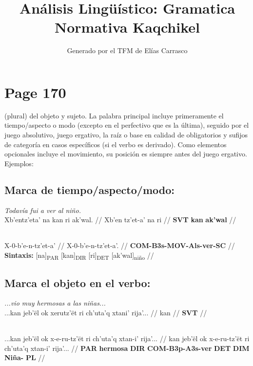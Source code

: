 \documentclass{article}%
\title{Análisis Lingüístico: Gramatica Normativa Kaqchikel}%
\author{Generado por el TFM de Elías Carrasco}%
\begin{document}
%
\normalsize%
\maketitle%
\section{Page 170}%
\label{sec:Page170}%
(plural) del objeto y sujeto. La palabra principal incluye primeramente el tiempo/aspecto %
o modo (excepto en el perfectivo que es la última), seguido por el juego absolutivo, %
juego ergativo, la raíz o base en calidad de obligatorios y sufijos de categoría en casos %
específicos (si el verbo es derivado). Como elementos opcionales incluye el movimiento, %
su posición es siempre antes del juego ergativo. Ejemplos: %
\subsection{Marca de tiempo/aspecto/modo:}%
\label{subsec:Marcadetiempo/aspecto/modo}%

%
\par\medskip%
\ex
\textit{Todavía fui a ver al niño.} \\
\begingl
\gla Xb'entz'eta' na kan ri ak'wal. //
\glb Xb'en tz'et-a' na ri //
\glc \textbf{SVT} \textbf{} \textbf{kan} \textbf{ak'wal} //
\endgl
\xe
%
\medskip%
\par\medskip%
\ex
\textit{} \\
\begingl
\gla X-0-b'e-n-tz'et-a' //
\glb X-0-b'e-n-tz'et-a'. //
\glc \textbf{COM-}\textbf{B3s-}\textbf{MOV-}\textbf{Als-}\textbf{ver-}\textbf{SC} //
\glft \textbf{Sintaxis:} [na]\textsubscript{PAR} [kan]\textsubscript{DIR} [ri]\textsubscript{DET} [ak'wal]\textsubscript{niño} //
\endgl
\xe
%
\medskip%
\subsection{Marca el objeto en el verbo:}%
\label{subsec:Marcaelobjetoenelverbo}%

%
\par\medskip%
\ex
\textit{...vio muy hermosas a las niñas...} \\
\begingl
\gla ...kan jeb'ël ok xerutz'ët ri ch'uta'q xtani' rija'... //
\glb kan //
\glc \textbf{SVT} //
\endgl
\xe
%
\medskip%
\par\medskip%
\ex
\textit{} \\
\begingl
\gla ...kan jeb'ël ok x-e-ru-tz'ët ri ch'uta'q xtan-i' rija'... //
\glb kan jeb'ël ok x-e-ru-tz'ët ri ch'uta'q xtan-i' rija'... //
\glc \textbf{PAR} \textbf{hermosa} \textbf{DIR} \textbf{COM-}\textbf{B3p-}\textbf{A3s-}\textbf{ver} \textbf{DET} \textbf{DIM} \textbf{Niña-} \textbf{PL} //
\endgl
\xe
%
\medskip%
\end{document}
